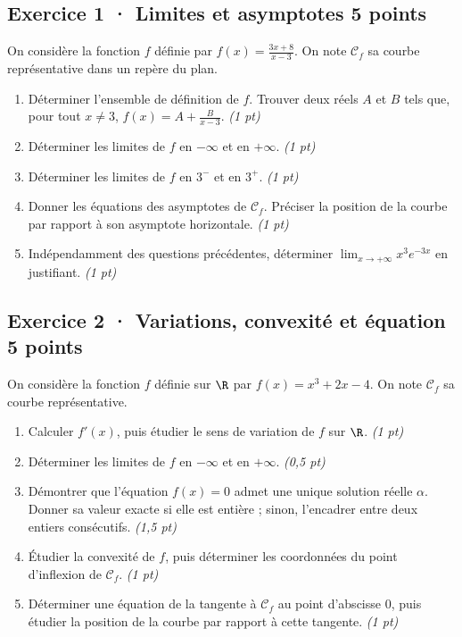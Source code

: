 \subsection*{Exercice 1 · Limites et asymptotes \hfill 5 points}On considère la fonction $f$ définie par $f(x)=\frac{3x+8}{x-3}$. On note $\mathcal C_f$ sa courbe représentative dans un repère du plan.

\begin{enumerate}

\item Déterminer l'ensemble de définition de $f$. Trouver deux réels $A$ et $B$ tels que, pour tout $x\ne3$, $f(x)=A+\frac B{x-3}$. \hfill\textit{(1 pt)}

\item Déterminer les limites de $f$ en $-\infty$ et en $+\infty$. \hfill\textit{(1 pt)}

\item Déterminer les limites de $f$ en $3^-$ et en $3^+$. \hfill\textit{(1 pt)}

\item Donner les équations des asymptotes de $\mathcal C_f$. Préciser la position de la courbe par rapport à son asymptote horizontale. \hfill\textit{(1 pt)}

\item Indépendamment des questions précédentes, déterminer $\displaystyle\lim_{x\to+\infty}x^{3}e^{-3x}$ en justifiant. \hfill\textit{(1 pt)}

\end{enumerate}

\subsection*{Exercice 2 · Variations, convexité et équation \hfill 5 points}On considère la fonction $f$ définie sur $\R$ par $f(x)=x^3+2x-4$. On note $\mathcal C_f$ sa courbe représentative.

\begin{enumerate}

\item Calculer $f' (x)$, puis étudier le sens de variation de $f$ sur $\R$. \hfill\textit{(1 pt)}

\item Déterminer les limites de $f$ en $-\infty$ et en $+\infty$. \hfill\textit{(0,5 pt)}

\item Démontrer que l'équation $f(x)=0$ admet une unique solution réelle $\alpha$. Donner sa valeur exacte si elle est entière ; sinon, l'encadrer entre deux entiers consécutifs. \hfill\textit{(1,5 pt)}

\item Étudier la convexité de $f$, puis déterminer les coordonnées du point d'inflexion de $\mathcal C_f$. \hfill\textit{(1 pt)}

\item Déterminer une équation de la tangente à $\mathcal C_f$ au point d'abscisse $0$, puis étudier la position de la courbe par rapport à cette tangente. \hfill\textit{(1 pt)}

\end{enumerate}

